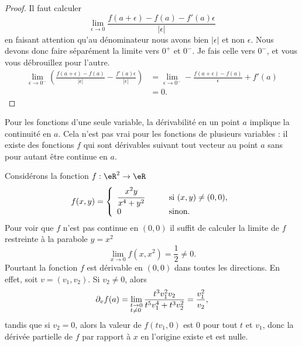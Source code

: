 \begin{proof}
	Il faut calculer
	\begin{equation}
		\lim_{\epsilon\to 0}\frac{ f(a+\epsilon)-f(a)-f'(a)\epsilon }{ | \epsilon | }
	\end{equation}
	en faisant attention qu'au dénominateur nous avons bien \( | \epsilon |\) et non \( \epsilon\). Nous devons donc faire séparément la limite vers \( 0^+\) et \( 0^-\). Je fais celle vers \( 0^-\), et vous vous débrouillez pour l'autre.
	\begin{subequations}
		\begin{align}
			\lim_{\epsilon\to 0^-}\left( \frac{ f(a+\epsilon)-f(a) }{ | \epsilon | }-\frac{ f'(a)\epsilon }{ | \epsilon | } \right) & =\lim_{\epsilon\to 0^-}-\frac{ f(a+\epsilon)-f(a) }{ \epsilon }+f'(a) \\
			                                                                                                                        & =0.
		\end{align}
	\end{subequations}
\end{proof}


Pour les fonctions d'une seule variable, la dérivabilité en un point \( a\) implique la continuité en \( a\). Cela n'est pas vrai pour les fonctions de plusieurs variables : il existe des fonctions \( f\)  qui sont dérivables suivant tout vecteur au point \( a\) sans pour autant être continue en \( a\).

\begin{example}
	Considérons la fonction \( f:\eR^2\to \eR\)
	\begin{equation}
		f(x,y)=\left\{
		\begin{array}{ll}
			\cfrac{x^2y}{x^4+y^2} \qquad & \textrm{si } (x,y)\neq (0,0), \\
			0                            & \textrm{sinon}.
		\end{array}
		\right.
	\end{equation}
	Pour voir que \( f\) n'est pas continue en \( (0,0)\) il suffit de calculer la limite de \( f\) restreinte à la parabole \( y=x^2\)
	\[
		\lim_{x\to 0} f(x,x^2)=\frac{1}{2} \neq 0.
	\]
	Pourtant la fonction \( f\) est dérivable en \( (0,0)\) dans toutes les directions. En effet, soit \( v=(v_1,v_2)\). Si \( v_2\neq 0\), alors
	\begin{equation}        \label{EQooXOCWooVbCjRd}
		\partial_v f(a)=\lim_{\begin{subarray}{l}
				t\to 0\\ t\neq 0
			\end{subarray}}
		\frac{t^3v_1^2v_2}{t^5 v_1^4+ t^3 v_2^2}=\frac{v_1^2}{v_2},
	\end{equation}
	tandis que si \( v_2=0\), alors la valeur de \( f(tv_1, 0)\)  est \( 0\) pour tout \( t\) et \( v_1\), donc la dérivée partielle de \( f\) par rapport à \( x\) en l'origine existe et est nulle.
\end{example}

